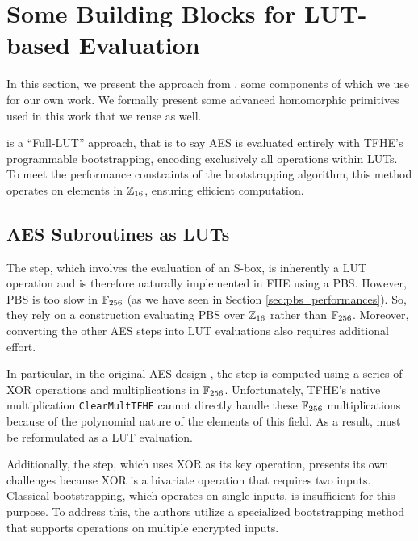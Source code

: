 
\section{Some Building Blocks for LUT-based Evaluation}
\label{sec:previous-blocks}


In this section, we present the approach from \cite{DBLP:conf/wahc/TramaCBS23}, some components of which we use for our own work. We formally present some advanced homomorphic primitives used in this work that we reuse as well.


\cite{DBLP:conf/wahc/TramaCBS23} is a ``Full-LUT'' approach, that is to say AES is evaluated entirely with TFHE's programmable bootstrapping, encoding exclusively all operations within LUTs. To meet the performance constraints of the bootstrapping algorithm, this method operates on elements in $\mathbb{Z}_{16}$, ensuring efficient computation.

\subsection{AES Subroutines as LUTs}

The \SubBytes step, which involves the evaluation of an S-box, is inherently a LUT operation and is therefore naturally implemented in FHE using a PBS. However, PBS is too slow in $\mathbb{F}_{256}$ (as we have seen in Section \ref{sec:pbs_performances}). So, they rely on a construction evaluating PBS over $\mathbb{Z}_{16}$ rather than $\mathbb{F}_{256}$. Moreover, converting the other AES steps into LUT evaluations also requires additional effort.

In particular, in the original AES design \cite{aes-original}, the \MixColumns step is computed using a series of XOR operations and multiplications in $\mathbb{F}_{256}$. Unfortunately, TFHE’s native multiplication \texttt{ClearMultTFHE} cannot directly handle these $\mathbb{F}_{256}$ multiplications because of the polynomial nature of the elements of this field. As a result, \MixColumns must be reformulated as a LUT evaluation.

Additionally, the \AddRoundKey step, which uses XOR as its key operation, presents its own challenges because XOR is a bivariate operation that requires two inputs. Classical bootstrapping, which operates on single inputs, is insufficient for this purpose. To address this, the authors utilize a specialized bootstrapping method that supports operations on multiple encrypted inputs.

